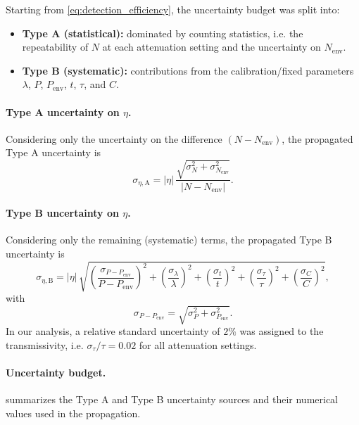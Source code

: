 Starting from \cref{eq:detection_efficiency},
the uncertainty budget was split into:
\begin{itemize}
  \item \textbf{Type A (statistical):} dominated by counting
    statistics, i.e. the repeatability of $N$ at each attenuation
    setting and the uncertainty on $N_{\mathrm{env}}$.
  \item \textbf{Type B (systematic):} contributions from the
    calibration/fixed parameters $\lambda$, $P$, $P_{\mathrm{env}}$,
    $t$, $\tau$, and $C$.
\end{itemize}

\paragraph{Type A uncertainty on $\eta$.}
Considering only the uncertainty on the difference $(N -
N_{\mathrm{env}})$, the propagated Type A uncertainty is
\begin{equation*}
  \sigma_{\eta,\mathrm{A}}
  =
  |\eta|\,
  \frac{\sqrt{\sigma_{N}^{2} + \sigma_{N_{\mathrm{env}}}^{2}}}{|N -
  N_{\mathrm{env}}|}.
\end{equation*}

\paragraph{Type B uncertainty on $\eta$.}
Considering only the remaining (systematic) terms, the propagated
Type B uncertainty is
\begin{equation*}
  \sigma_{\eta,\mathrm{B}}
  =
  |\eta|\,
  \sqrt{
    \left(\frac{\sigma_{P-P_{\mathrm{env}}}}{P - P_{\mathrm{env}}}\right)^{2}
    +
    \left(\frac{\sigma_{\lambda}}{\lambda}\right)^{2}
    +
    \left(\frac{\sigma_{t}}{t}\right)^{2}
    +
    \left(\frac{\sigma_{\tau}}{\tau}\right)^{2}
    +
    \left(\frac{\sigma_{C}}{C}\right)^{2}
  },
\end{equation*}
with
\[
  \sigma_{P-P_{\mathrm{env}}}=\sqrt{\sigma_{P}^{2}+\sigma_{P_{\mathrm{env}}}^{2}}.
\]
In our analysis, a relative standard uncertainty of $2\%$ was
assigned to the transmissivity, i.e. $\sigma_{\tau}/\tau = 0.02$ for
all attenuation settings.

\paragraph{Uncertainty budget.}
 summarizes the Type A and
Type B uncertainty sources and their numerical values used in the propagation.

